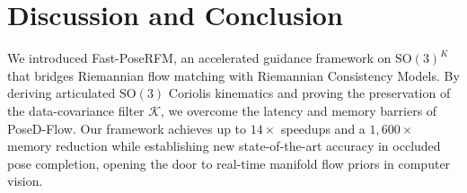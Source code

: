 \documentclass[10pt,twocolumn,letterpaper]{article}
\begin{document}
\section{Discussion and Conclusion}
We introduced Fast-PoseRFM, an accelerated guidance framework on $\mathrm{SO}(3)^K$ that bridges Riemannian flow matching with Riemannian Consistency Models. By deriving articulated $\mathrm{SO}(3)$ Coriolis kinematics and proving the preservation of the data-covariance filter $\mathcal{K}$, we overcome the latency and memory barriers of PoseD-Flow. Our framework achieves up to $14\times$ speedups and a $1,600\times$ memory reduction while establishing new state-of-the-art accuracy in occluded pose completion, opening the door to real-time manifold flow priors in computer vision.

{\small


}
\end{document}

